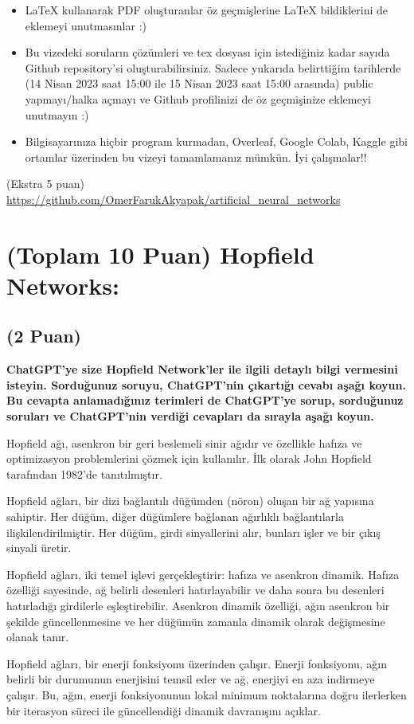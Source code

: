 \documentclass[11pt]{article}
\begin{document}
\begin{itemize}
    \item LaTeX kullanarak PDF oluşturanlar öz geçmişlerine LaTeX bildiklerini de eklemeyi unutmasınlar :)
    \item Bu vizedeki soruların çözümleri ve tex dosyası için istediğiniz kadar sayıda Github repository'si oluşturabilirsiniz. Sadece yukarıda belirttiğim tarihlerde (14 Nisan 2023 saat 15:00 ile 15 Nisan 2023 saat 15:00 arasında) public yapmayı/halka açmayı ve Github profilinizi de öz geçmişinize eklemeyi unutmayın :)
    \item Bilgisayarınıza hiçbir program kurmadan, Overleaf, Google Colab, Kaggle gibi ortamlar üzerinden bu vizeyi tamamlamanız mümkün. İyi çalışmalar!!
\end{itemize}

(Ekstra 5 puan) \url{https://github.com/OmerFarukAkyapak/artificial_neural_networks}

\newpage
\section{(Toplam 10 Puan) Hopfield Networks:}

\subsection{(2 Puan)} \textbf{ChatGPT’ye size Hopfield Network’ler ile ilgili detaylı bilgi vermesini isteyin. Sorduğunuz soruyu, ChatGPT'nin çıkartığı cevabı aşağı koyun. Bu cevapta anlamadığınız terimleri de ChatGPT’ye sorup, sorduğunuz soruları ve ChatGPT’nin verdiği cevapları da sırayla aşağı koyun.}

Hopfield ağı, asenkron bir geri beslemeli sinir ağıdır ve özellikle hafıza ve optimizasyon problemlerini çözmek için kullanılır. İlk olarak John Hopfield tarafından 1982'de tanıtılmıştır.

Hopfield ağları, bir dizi bağlantılı düğümden (nöron) oluşan bir ağ yapısına sahiptir. Her düğüm, diğer düğümlere bağlanan ağırlıklı bağlantılarla ilişkilendirilmiştir. Her düğüm, girdi sinyallerini alır, bunları işler ve bir çıkış sinyali üretir.

Hopfield ağları, iki temel işlevi gerçekleştirir: hafıza ve asenkron dinamik. Hafıza özelliği sayesinde, ağ belirli desenleri hatırlayabilir ve daha sonra bu desenleri hatırladığı girdilerle eşleştirebilir. Asenkron dinamik özelliği, ağın asenkron bir şekilde güncellenmesine ve her düğümün zamanla dinamik olarak değişmesine olanak tanır.

Hopfield ağları, bir enerji fonksiyonu üzerinden çalışır. Enerji fonksiyonu, ağın belirli bir durumunun enerjisini temsil eder ve ağ, enerjiyi en aza indirmeye çalışır. Bu, ağın, enerji fonksiyonunun lokal minimum noktalarına doğru ilerlerken bir iterasyon süreci ile güncellendiği dinamik davranışını açıklar.
\end{document}
